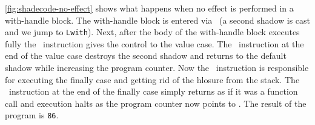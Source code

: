 \documentclass[class=article, crop=false]{standalone}
\begin{document}
\autoref{fig:shadecode-no-effect} shows what happens when no effect is performed
in a with-handle block. The with-handle block is entered via \vmCastShadow\
(a second shadow is cast and we jump to \lstinline{Lwith}). Next, after the
body of the with-handle block executes fully the \vmKillShadow\ instruction
gives the control to the value case. The \vmRett\ instruction at the end of
the value case destroys the second shadow and returns to the default shadow
while increasing the program counter. Now the \vmFin\ instruction is responsible
for executing the finally case and getting rid of the hlosure from the stack.
The \vmRet\ instruction at the end of the finally case simply returns as if it
was a function call and execution halts as the program counter now points to
\vmHalt. The result of the program is \lstinline|86|.
\end{document}
